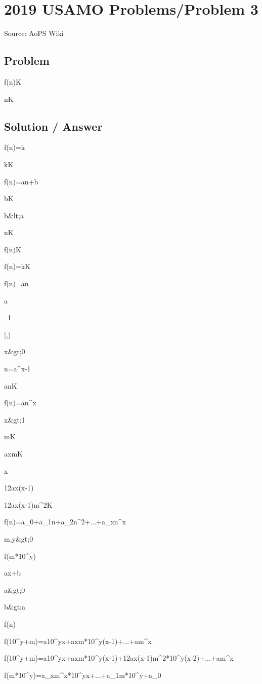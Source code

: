 \documentclass[12pt]{article}
\begin{document}
\section*{2019 USAMO Problems/Problem 3}
Source: AoPS Wiki

\subsection*{Problem}
f(n)\in K

n\in K

\subsection*{Solution / Answer}
f(n)=k

k\in K

f(n)=an+b

b\in K

b&lt;a

n\in K

f(n)\notin K

f(n)=k\notin K

f(n)=an

\lg a

\bmod\ 1

[,)

x&gt;0

n=a^{x-1}

an\notin K

f(n)=an^x

x&gt;1

m\in K

axm\notin K

x

\frac12ax(x-1)

\frac12ax(x-1)m^2\notin K

f(n)=a_0+a_1n+a_2n^2+...+a_xn^x

m,y&gt;0

f(m*10^y)

ax+b

a&gt;0

b&gt;a

f(n)

f(10^y+m)=a10^{yx}+axm*10^{y(x-1)}+...+am^x

f(10^y+m)=a10^{yx}+axm*10^{y(x-1)}+\frac12ax(x-1)m^2*10^{y(x-2)}+...+am^x

f(m*10^y)=a_xm^x*10^{yx}+...+a_1m*10^y+a_0
\end{document}
